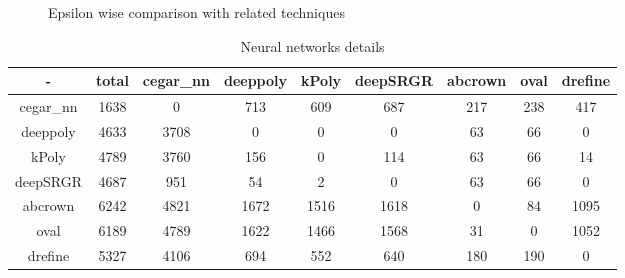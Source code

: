 
\begin{figure}
    \centering
    
    \caption{Epsilon wise comparison with related techniques}
    \label{res:ep:milp_with_milp}
\end{figure}


\begin{table}
    \centering
    \begin{tabular}{|c|c|c|c|c|c|c|c|c|}
        \hline
        - & \textbf{total} & \textbf{cegar\_nn} & \textbf{deeppoly} & \textbf{kPoly} & \textbf{deepSRGR} & \textbf{abcrown} & \textbf{oval} & \textbf{drefine} \\
        \hline
        cegar\_nn & 1638 & 0 & 713 & 609 & 687 & 217 & 238 & 417 \\ 
        \hline
        deeppoly & 4633 & 3708 & 0 & 0 & 0 & 63 & 66 & 0  \\ 
        \hline
        kPoly & 4789 & 3760 & 156 & 0 & 114 & 63 & 66 & 14  \\ 
        \hline
        deepSRGR & 4687 & 951 & 54 & 2 & 0 & 63 & 66 & 0 \\ 
        \hline
        abcrown & 6242 & 4821 & 1672 & 1516 & 1618 & 0 & 84 & 1095  \\
        \hline
        oval & 6189 & 4789 & 1622 & 1466 & 1568 & 31 & 0 & 1052 \\
        \hline
        drefine & 5327 & 4106 & 694 & 552 & 640 & 180 & 190 & 0  \\
        \hline
    \end{tabular}
    \caption{Neural networks details}
    \label{tb:matrix}
\end{table}